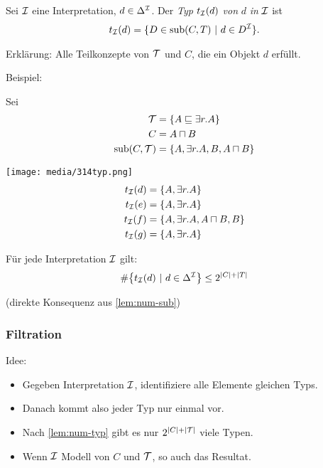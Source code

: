 \begin{definition}
Sei $\mathcal{I}$ eine Interpretation, $d \in \Delta^{\mathcal{I}}$. Der \emph{Typ}
$t_\MI\left( d \right)$ \emph{von} $d$ \emph{in} $\mathcal{I}$ ist
\begin{align*}
t_\MI\left( d \right) = \left\{ D \in \sub\left( C,T \right)\  \right|\ d \in D^\MI\}.
\end{align*}
\end{definition}
Erklärung: Alle Teilkonzepte von $\mathcal{T}$ und $C$, die ein Objekt $d$
erfüllt.

\begin{tafel}\label{t:typen}
Beispiel:

Sei
\begin{align*}
    \mathcal{T} &=\{A \sqsubseteq \exists r.A\}\\
    C &= A \sqcap B\\
    \operatorname{sub}(C,\mathcal{T}) &= \{A, \exists r.A, B, A \sqcap B\}
\end{align*}

\texttt{[image: media/314typ.png]}
\begin{align*}
    t_{\mathcal{I}}(d)&=\{A, \exists r.A\}\\
    t_{\mathcal{I}}(e)&=\{A, \exists r.A\}\\
    t_{\mathcal{I}}(f)&=\{A, \exists r.A, A \sqcap B, B\}\\
    t_{\mathcal{I}}(g)&=\{A, \exists r.A\}
\end{align*}
\end{tafel}

\begin{lemma}
    \label{lem:num-typ}
Für jede Interpretation $\mathcal{I}$ gilt:
\begin{align*}
\#\left\{ t_\MI\left( d \right)\ |\ d \in \Delta^\MI \right\} \leq 2^{\left| C \right| + |T|}
\end{align*}
\end{lemma}
(direkte Konsequenz aus \autoref{lem:num-sub})

\subsubsection{Filtration}\label{filtration}
Idee:

\begin{itemize}
  \item Gegeben Interpretation $\mathcal{I}$, identifiziere alle Elemente gleichen Typs.
  \item Danach kommt also jeder Typ nur einmal vor.
  \item Nach \autoref{lem:num-typ} gibt es nur $2^{|C|+|\mathcal{T}|}$ viele Typen.
  \item Wenn $\mathcal{I}$ Modell von $C$ und $\mathcal{T}$, so auch das Resultat.
\end{itemize}

